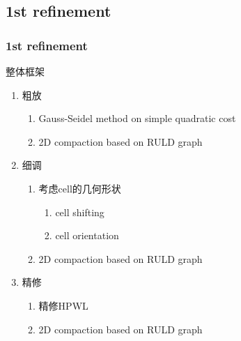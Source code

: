 \documentclass[UTF8,lualatex]{ctexbeamer}
\begin{document}

\subsection{1st refinement}

\begin{frame}
    \frametitle{1st refinement}
    
    \begin{block}{整体框架}
        \begin{enumerate}
            \item \color{gray}粗放
                \begin{enumerate}
                    \color{gray}
                    \item Gauss-Seidel method on simple quadratic cost
                    \item 2D compaction based on RULD graph
                \end{enumerate}
            \item 细调
                \begin{enumerate}
                    \item 考虑cell的几何形状
                        \begin{enumerate}
                            \item cell shifting
                            \item cell orientation
                        \end{enumerate}
                    \color{gray}
                    \item 2D compaction based on RULD graph
                \end{enumerate}
            \color{gray}
            \item 精修
                \begin{enumerate}
                    \color{gray}
                    \item 精修HPWL
                    \item 2D compaction based on RULD graph
                \end{enumerate}
        \end{enumerate}
    \end{block}
\end{frame}
\end{document}
